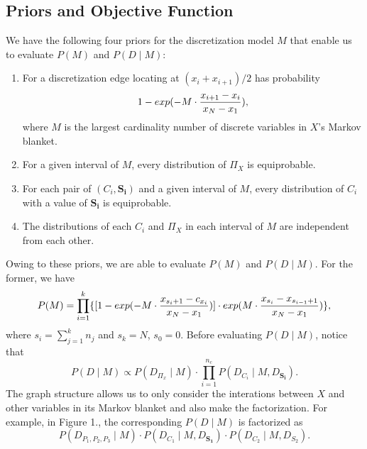 

\subsection{Priors and Objective Function}
\label{obj}
We have the following four priors for the discretization model $M$ that enable us to evaluate $P(M)$ and $P(D \mid M)$:\\
\begin{enumerate}
\item For a discretization edge locating at $(x_i + x_{i+1})/2$ has probability
\begin{equation}
1 - {exp(- M \cdot {{x_{i+1} - x_i}\over{x_N - x_1}})},
\end{equation}
where $M$ is the largest cardinality number of discrete variables in $X$'s Markov blanket.
\item For a given interval of $M$, every distribution of $\Pi_X$ is equiprobable.
\item For each pair of $(C_i,\boldsymbol{S_i})$ and a given interval of $M$, every distribution of $C_i$ with a value of $\boldsymbol{S_i}$ is equiprobable.
\item The distributions of each $C_i$ and $\Pi_X$ in each interval of $M$ are independent from each other.
\end{enumerate} 

Owing to these priors, we are able to evaluate $P(M)$ and $P(D \mid M)$. For the former, we have
\begin{equation}
P(M) = \prod_{i=1}^k \{ [1 - {exp(- M \cdot {{x_{s_i+1} - c_{x_i}}\over{x_N - x_1}})}] \cdot exp(M \cdot {{x_{s_{i}} - x_{s_{i-1} + 1}}\over{x_N - x_1}}) \},
\end{equation}
where $s_i = \sum_{j=1}^k n_j$ and $s_k = N$, $s_0 = 0$. Before evaluating $P(D \mid M)$, notice that
\begin{equation}
P(D \mid M) \propto P(D_{\Pi_x} \mid M) \cdot \prod_{i = 1}^{n_c} P(D_{C_i} \mid M, D_{\boldsymbol{S_i}}).
\end{equation}
The graph structure allows us to only consider the interations between $X$ and other variables in its Markov blanket and also make the factorization. For example, in Figure 1., the corresponding $P(D \mid M)$ is factorized as
\begin{equation}
P(D_{ P_1,P_2,P_3 } \mid M) \cdot P( D_{ C_1 } \mid M,D_{\boldsymbol{S_1}}) \cdot P(D_{C_2} \mid M,D_{ S_2  }).
\end{equation} 

